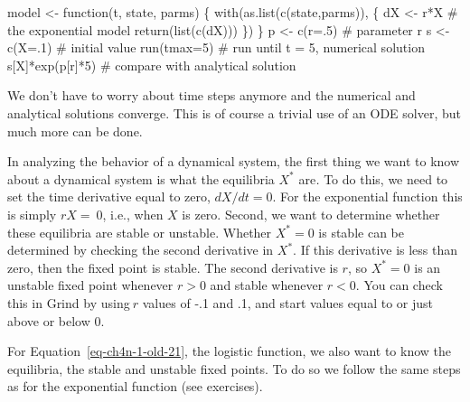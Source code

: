 \documentclass[
  a4paper,
  DIV=11,
  numbers=noendperiod,
  oneside]{scrreprt}
\newenvironment{Shaded}{\begin{snugshade}}{\end{snugshade}}
\newcommand{\AttributeTok}[1]{\textcolor[rgb]{0.40,0.45,0.13}{#1}}
\newcommand{\CommentTok}[1]{\textcolor[rgb]{0.37,0.37,0.37}{#1}}
\newcommand{\ControlFlowTok}[1]{\textcolor[rgb]{0.00,0.23,0.31}{#1}}
\newcommand{\DecValTok}[1]{\textcolor[rgb]{0.68,0.00,0.00}{#1}}
\newcommand{\FunctionTok}[1]{\textcolor[rgb]{0.28,0.35,0.67}{#1}}
\newcommand{\NormalTok}[1]{\textcolor[rgb]{0.00,0.23,0.31}{#1}}
\newcommand{\OtherTok}[1]{\textcolor[rgb]{0.00,0.23,0.31}{#1}}
\newcommand{\SpecialCharTok}[1]{\textcolor[rgb]{0.37,0.37,0.37}{#1}}
\newcommand{\StringTok}[1]{\textcolor[rgb]{0.13,0.47,0.30}{#1}}
\begin{document}
\begin{Shaded}
\begin{Highlighting}[]
\NormalTok{model }\OtherTok{\textless{}{-}} \ControlFlowTok{function}\NormalTok{(t, state, parms) \{}
  \FunctionTok{with}\NormalTok{(}\FunctionTok{as.list}\NormalTok{(}\FunctionTok{c}\NormalTok{(state,parms)), \{}
\NormalTok{    dX }\OtherTok{\textless{}{-}}\NormalTok{ r}\SpecialCharTok{*}\NormalTok{X            }\CommentTok{\# the exponential model}
      \FunctionTok{return}\NormalTok{(}\FunctionTok{list}\NormalTok{(}\FunctionTok{c}\NormalTok{(dX)))}
\NormalTok{  \})}
\NormalTok{\}}
\NormalTok{p }\OtherTok{\textless{}{-}} \FunctionTok{c}\NormalTok{(}\AttributeTok{r=}\NormalTok{.}\DecValTok{5}\NormalTok{) }\CommentTok{\# parameter r}
\NormalTok{s }\OtherTok{\textless{}{-}} \FunctionTok{c}\NormalTok{(}\AttributeTok{X=}\NormalTok{.}\DecValTok{1}\NormalTok{) }\CommentTok{\# initial value}
\FunctionTok{run}\NormalTok{(}\AttributeTok{tmax=}\DecValTok{5}\NormalTok{) }\CommentTok{\# run until t = 5, numerical solution}
\NormalTok{s[}\StringTok{\textquotesingle{}X\textquotesingle{}}\NormalTok{]}\SpecialCharTok{*}\FunctionTok{exp}\NormalTok{(p[}\StringTok{\textquotesingle{}r\textquotesingle{}}\NormalTok{]}\SpecialCharTok{*}\DecValTok{5}\NormalTok{) }\CommentTok{\# compare with analytical solution}
\end{Highlighting}
\end{Shaded}

We don't have to worry about time steps anymore and the numerical and
analytical solutions converge. This is of course a trivial use of an ODE
solver, but much more can be done.

In analyzing the behavior of a dynamical system, the first thing we want
to know about a dynamical system is what the equilibria \(X^{*}\)
are\emph{.} To do this, we need to set the time derivative equal to
zero, \(dX/dt = 0\). For the exponential function this is simply
\(rX = \ 0\), i.e., when \(X\) is zero. Second, we want to determine
whether these equilibria are stable or unstable. Whether \(X^{*}=0\) is
stable can be determined by checking the second derivative in \(X^{*}\).
If this derivative is less than zero, then the fixed point is stable.
The second derivative is \(r\), so \(X^{*} = 0\) is an unstable fixed
point whenever \(r > 0\) and stable whenever \(r < 0\). You can check
this in Grind by using\(\ r\) values of -.1 and .1, and start values
equal to or just above or below 0.

For Equation~\ref{eq-ch4n-1-old-21}, the logistic function, we also want
to know the equilibria, the stable and unstable fixed points. To do so
we follow the same steps as for the exponential function (see
exercises).
\end{document}
